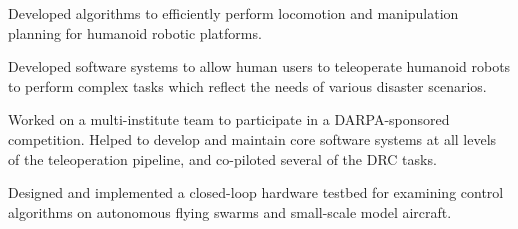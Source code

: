 \documentclass[10pt,a4paper,ragged2e]{altacv}
\begin{document}
Developed algorithms to efficiently perform locomotion and manipulation planning for humanoid robotic platforms.

\divider

Developed software systems to allow human users to teleoperate humanoid robots to perform complex tasks which reflect the needs of various disaster scenarios.

\divider

Worked on a multi-institute team to participate in a DARPA-sponsored competition. Helped to develop and maintain core software systems at all levels of the teleoperation pipeline, and co-piloted several of the DRC tasks.

\divider

Designed and implemented a closed-loop hardware testbed for examining control algorithms on autonomous flying swarms and small-scale model aircraft.

\clearpage


\nocite{*}


\printbibliography[heading=pubtype,title={\printinfo{\faGraduationCap}{Doctoral Thesis}},type=thesis]

\divider

\printbibliography[heading=pubtype,title={\printinfo{\faFileTextO}{Journal Article}},type=article]

\divider

\printbibliography[heading=pubtype,title={\printinfo{\faGroup}{Conference Proceedings}},type=inproceedings]


\end{document}
